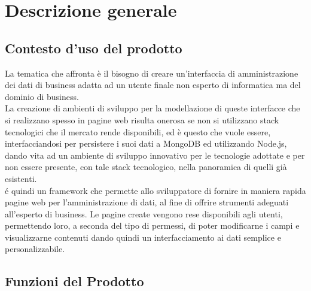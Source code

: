 \section{Descrizione generale}

	\subsection{Contesto d'uso del prodotto}
		
		La tematica che \ProjectName affronta è il bisogno di creare un'interfaccia di amministrazione dei dati di business adatta
		ad un utente finale non esperto di informatica ma del dominio di business.\\
		La creazione di ambienti di sviluppo per la modellazione di queste interfacce che si realizzano spesso in pagine web risulta
		onerosa se non si utilizzano stack tecnologici che il mercato rende disponibili, ed è questo che \ProjectName vuole essere,
		interfacciandosi per persistere i suoi dati a MongoDB ed utilizzando Node.js, dando vita ad un ambiente di sviluppo
		innovativo per le tecnologie adottate e per non essere presente, con tale stack tecnologico, nella panoramica di quelli già
		esistenti. \\
		 \ProjectName é quindi un framework che permette allo sviluppatore di fornire in maniera rapida pagine web per
		 l'amministrazione di dati, al fine di offrire strumenti adeguati all'esperto di business.
		Le pagine create vengono rese disponibili agli utenti, permettendo loro, a seconda del tipo di permessi, di poter modificarne
		i campi e visualizzarne contenuti dando quindi un interfacciamento ai dati semplice e personalizzabile.

	\subsection{Funzioni del Prodotto}
	
		
